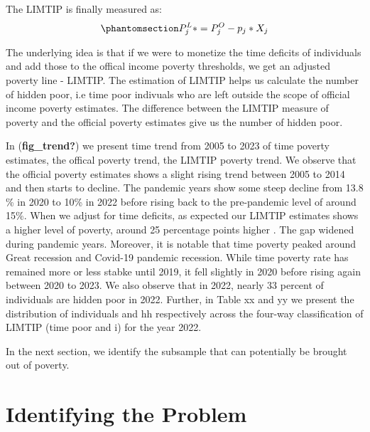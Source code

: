 \documentclass[
  11pt,
]{article}
\begin{document}
The LIMTIP is finally measured as:
\begin{equation}\phantomsection\label{eq-limtip}{P_{j}^L* = P_{j}^O- p_{j}*X_{j}
}\end{equation}

The underlying idea is that if we were to monetize the time deficits of
individuals and add those to the offical income poverty thresholds, we
get an adjusted poverty line - LIMTIP. The estimation of LIMTIP helps us
calculate the number of hidden poor, i.e time poor indivuals who are
left outside the scope of official income poverty estimates. The
difference between the LIMTIP measure of poverty and the official
poverty estimates give us the number of hidden poor.

In (\textbf{fig\_trend?}) we present time trend from 2005 to 2023 of
time poverty estimates, the offical poverty trend, the LIMTIP poverty
trend. We observe that the official poverty estimates shows a slight
rising trend between 2005 to 2014 and then starts to decline. The
pandemic years show some steep decline from 13.8 \% in 2020 to 10\% in
2022 before rising back to the pre-pandemic level of around 15\%. When
we adjust for time deficits, as expected our LIMTIP estimates shows a
higher level of poverty, around 25 percentage points higher . The gap
widened during pandemic years. Moreover, it is notable that time poverty
peaked around Great recession and Covid-19 pandemic recession. While
time poverty rate has remained more or less stabke until 2019, it fell
slightly in 2020 before rising again between 2020 to 2023. We also
observe that in 2022, nearly 33 percent of individuals are hidden poor
in 2022. Further, in Table xx and yy we present the distribution of
individuals and hh respectively across the four-way classification of
LIMTIP (time poor and i) for the year 2022.

In the next section, we identify the subsample that can potentially be
brought out of poverty.

\section{Identifying the Problem}\label{identifying-the-problem}
\end{document}
